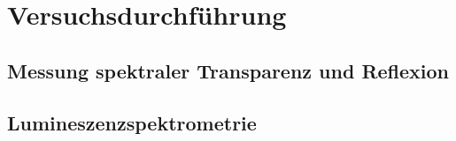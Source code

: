 \section{Versuchsdurchführung}
	\subsection{Messung spektraler Transparenz und Reflexion} \label{sec:shimadzu}
	
	\subsection{Lumineszenzspektrometrie}

